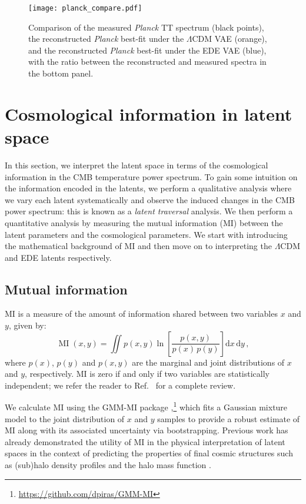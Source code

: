 \documentclass[aps, prd, reprint, superscriptaddress, nofootinbib, bibnotes]{revtex4-2}
\newcommand{\Planck}{\textit{Planck}}
\begin{document}
\begin{figure}
\centering
\texttt{[image: planck\_compare.pdf]}
\caption{Comparison of the measured \Planck{} TT spectrum (black points), the reconstructed \Planck{} best-fit under the $\Lambda$CDM VAE (orange), and the reconstructed \Planck{} best-fit under the EDE VAE (blue), with the ratio between the reconstructed and measured spectra in the bottom panel.}
\label{fig:planck_compare}
\end{figure}



\section{Cosmological information in latent space}\label{sec:interpret}
In this section, we interpret the latent space in terms of the cosmological information in the CMB temperature power spectrum. 
To gain some intuition on the information encoded in the latents, we perform a qualitative analysis where we vary each latent systematically and observe the induced changes in the CMB power spectrum: this is known as a \textit{latent traversal} analysis. We then perform a quantitative analysis by measuring the mutual information (MI) between the latent parameters and the cosmological parameters. We start with introducing the mathematical background of MI and then move on to interpreting the $\Lambda$CDM and EDE latents respectively.

\subsection{Mutual information}
\label{sec:MI_calculation}
MI is a measure of the amount of information shared between two variables $x$ and $y$, given by:
\begin{equation}\label{eq:MI}
\operatorname{MI}\left(x,y\right)=\iint  p(x, y) \ln \left[\frac{p(x, y)}{p(x)\, p(y)}\right] \mathrm{d} x \,\mathrm{d} y \,,
\end{equation}
where $p(x)$, $p(y)$ and $p(x,y)$ are the marginal and joint distributions of $x$ and $y$, respectively.
MI is zero if and only if two variables are statistically independent; we refer the reader to Ref.~\cite{Vergara15} for a complete review. 

We calculate MI using the \mbox{GMM-MI} package \citep{Piras2023},\footnote{\url{https://github.com/dpiras/GMM-MI}} which fits a Gaussian mixture model to the joint distribution of $x$ and $y$ samples to provide a robust estimate of MI along with its associated uncertainty via bootstrapping.
Previous work has already demonstrated the utility of MI in the physical interpretation of latent spaces in the context of predicting the properties of final cosmic structures such as (sub)halo density profiles \citep{Lucie-Smith2022, Lucie-Smith2023, Lucie-Smith:2024xsx} and the halo mass function \citep{Guo_2024}. 
\end{document}
